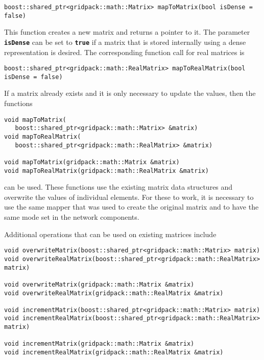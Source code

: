 {
\color{red}
\begin{Verbatim}[fontseries=b]
boost::shared_ptr<gridpack::math::Matrix> mapToMatrix(bool isDense = false)
\end{Verbatim}
}

This function creates a new matrix and returns a pointer to it. The parameter
\texttt{\textbf{isDense}} can be set to \texttt{\textbf{true}} if a matrix that
is stored internally using a dense representation is desired. The corresponding
function call for real matrices is

{
\color{red}
\begin{Verbatim}[fontseries=b]
boost::shared_ptr<gridpack::math::RealMatrix> mapToRealMatrix(bool isDense = false)
\end{Verbatim}
}

If a matrix already exists and it is only necessary to update the values, then the functions

{
\color{red}
\begin{Verbatim}[fontseries=b]
void mapToMatrix(
   boost::shared_ptr<gridpack::math::Matrix> &matrix)
void mapToRealMatrix(
   boost::shared_ptr<gridpack::math::RealMatrix> &matrix)

void mapToMatrix(gridpack::math::Matrix &matrix)
void mapToRealMatrix(gridpack::math::RealMatrix &matrix)
\end{Verbatim}
}

can be used. These functions use the existing matrix data structures and overwrite the values of individual elements. For these to work, it is necessary to use the same mapper that was used to create the original matrix and to have the same mode set in the network components.

Additional operations that can be used on existing matrices include

{
\color{red}
\begin{Verbatim}[fontseries=b]
void overwriteMatrix(boost::shared_ptr<gridpack::math::Matrix> matrix)
void overwriteRealMatrix(boost::shared_ptr<gridpack::math::RealMatrix> matrix)

void overwriteMatrix(gridpack::math::Matrix &matrix)
void overwriteRealMatrix(gridpack::math::RealMatrix &matrix)

void incrementMatrix(boost::shared_ptr<gridpack::math::Matrix> matrix)
void incrementRealMatrix(boost::shared_ptr<gridpack::math::RealMatrix> matrix)

void incrementMatrix(gridpack::math::Matrix &matrix)
void incrementRealMatrix(gridpack::math::RealMatrix &matrix)
\end{Verbatim}
}

